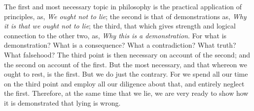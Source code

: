 The first and most necessary topic in philosophy is the practical
application of principles, as, \emph{We ought not to lie}; the second is that
of demonstrations as, \emph{Why it is that we ought not to lie}; the third,
that which gives strength and logical connection to the other two, as,
\emph{Why this is a demonstration}. For what is demonstration? What is a
consequence? What a contradiction? What truth? What falsehood? The third
point is then necessary on account of the second; and the second on
account of the first. But the most necessary, and that whereon we ought
to rest, is the first. But we do just the contrary. For we spend all our
time on the third point and employ all our diligence about that, and
entirely neglect the first. Therefore, at the same time that we lie, we
are very ready to show how it is demonstrated that lying is wrong.
